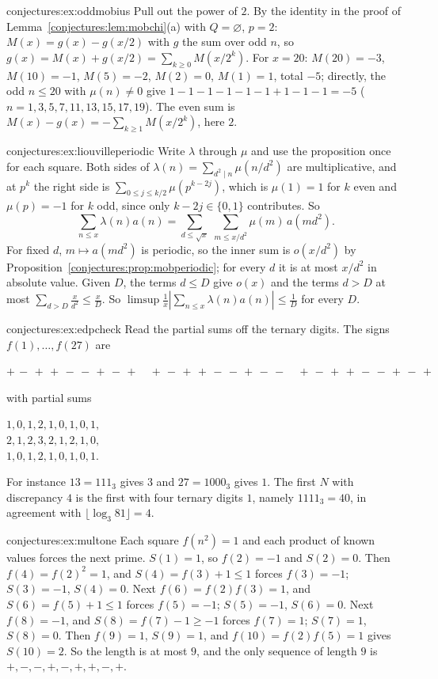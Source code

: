 \begin{solution}{conjectures:ex:oddmobius}
\idea Pull out the power of $2$.
\writeup By the identity in the proof of Lemma~\ref{conjectures:lem:mobchi}(a) with $Q=\varnothing$, $p=2$: $M(x)=g(x)-g(x/2)$ with $g$ the sum over odd $n$, so
$g(x)=M(x)+g(x/2)=\sum_{k\ge0}M(x/2^k)$. For $x=20$: $M(20)=-3$, $M(10)=-1$, $M(5)=-2$, $M(2)=0$, $M(1)=1$, total $-5$; directly, the odd $n\le20$ with
$\mu(n)\ne0$ give $1-1-1-1-1-1+1-1-1=-5$ ($n=1,3,5,7,11,13,15,17,19$). The even sum is $M(x)-g(x)=-\sum_{k\ge1}M(x/2^k)$, here $2$.
\end{solution}

\begin{solution}{conjectures:ex:liouvilleperiodic}
\idea Write $\lambda$ through $\mu$ and use the proposition once for each square.
\writeup Both sides of $\lambda(n)=\sum_{d^2\mid n}\mu(n/d^2)$ are multiplicative, and at $p^k$ the right side is $\sum_{0\le j\le k/2}\mu(p^{k-2j})$, which is
$\mu(1)=1$ for $k$ even and $\mu(p)=-1$ for $k$ odd, since only $k-2j\in\{0,1\}$ contributes. So
\[
\sum_{n\le x}\lambda(n)a(n)=\sum_{d\le\sqrt x}\ \sum_{m\le x/d^2}\mu(m)\,a(md^2).
\]
For fixed $d$, $m\mapsto a(md^2)$ is periodic, so the inner sum is $o(x/d^2)$ by Proposition~\ref{conjectures:prop:mobperiodic}; for every $d$ it is at most $x/d^2$ in absolute value.
Given $D$, the terms $d\le D$ give $o(x)$ and the terms $d>D$ at most $\sum_{d>D}\frac x{d^2}\le\frac xD$. So $\limsup\frac1x|\sum_{n\le x}\lambda(n)a(n)|\le\frac1D$ for every
$D$.
\end{solution}

\begin{solution}{conjectures:ex:edpcheck}
\idea Read the partial sums off the ternary digits.
\writeup The signs $f(1),\dots,f(27)$ are
\begin{center}
$+\,-\,+\,+\,-\,-\,+\,-\,+\quad+\,-\,+\,+\,-\,-\,+\,-\,-\quad+\,-\,+\,+\,-\,-\,+\,-\,+$
\end{center}
with partial sums
\begin{center}
$1,0,1,2,1,0,1,0,1,$\\
$2,1,2,3,2,1,2,1,0,$\\
$1,0,1,2,1,0,1,0,1.$
\end{center} For instance $13=111_3$ gives $3$ and $27=1000_3$ gives $1$. The first $N$ with discrepancy $4$ is the first
with four ternary digits $1$, namely $1111_3=40$, in agreement with $\lfloor\log_3 81\rfloor=4$.
\end{solution}

\begin{solution}{conjectures:ex:multone}
\idea Each square $f(n^2)=1$ and each product of known values forces the next prime.
\writeup $S(1)=1$, so $f(2)=-1$ and $S(2)=0$. Then $f(4)=f(2)^2=1$, and $S(4)=f(3)+1\le1$ forces $f(3)=-1$; $S(3)=-1$, $S(4)=0$. Next $f(6)=f(2)f(3)=1$, and
$S(6)=f(5)+1\le1$ forces $f(5)=-1$; $S(5)=-1$, $S(6)=0$. Next $f(8)=-1$, and $S(8)=f(7)-1\ge-1$ forces $f(7)=1$; $S(7)=1$, $S(8)=0$. Then $f(9)=1$, $S(9)=1$, and
$f(10)=f(2)f(5)=1$ gives $S(10)=2$. So the length is at most $9$, and the only sequence of length $9$ is $+,-,-,+,-,+,+,-,+$.
\end{solution}

